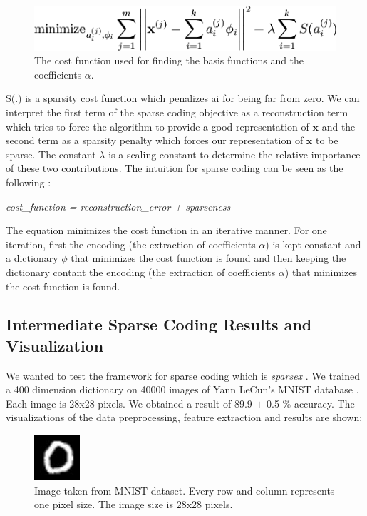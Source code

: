 \documentclass[	DIV=calc,%
				paper=a4,%
				fontsize=11pt,%
				twocolumn]{scrartcl}	 %
\begin{document}
\begin{figure}[H]
    \centering
    \includegraphics[width=0.8\linewidth]{data/sc_data/sc_equation.png}
    \caption{The cost function used for finding the basis functions and the coefficients $\alpha$.}
    \label{cnn_results_4.png}
\end{figure}

S(.) is a sparsity cost function which penalizes ai for being far from zero. We can interpret the first term of the sparse coding objective as a reconstruction term which tries to force the algorithm to provide a good representation of $\mathbf{x}$ and the second term as a sparsity penalty which forces our representation of $\mathbf{x}$ to be sparse. The constant $\lambda$ is a scaling constant to determine the relative importance of these two contributions. The intuition for sparse coding can be seen as the following \cite{olshausen_1997} :

\textit{cost\_function = reconstruction\_error + sparseness} 

\noindent The equation minimizes the cost function in an iterative manner. For one iteration, first the encoding (the extraction of coefficients $\alpha$) is kept constant and a dictionary $\phi$ that minimizes the cost function is found and then keeping the dictionary contant the encoding (the extraction of coefficients $\alpha$) that minimizes the cost function is found.


\subsection*{Intermediate Sparse Coding Results and Visualization}
We wanted to test the framework for sparse coding which is \textit{sparsex} \cite{sparsex}. We trained a 400 dimension dictionary on 40000 images of Yann LeCun's MNIST database \cite{mnist}. Each image is 28x28 pixels. We obtained a result of 89.9  $\pm$ 0.5 \% accuracy. The visualizations of the data preprocessing, feature extraction and results are shown:

\begin{figure}[H]
    \centering
    \includegraphics[width=0.3\linewidth]{data/sc_data/sc_mnist_image.jpg}
    \caption{Image taken from MNIST dataset. Every row and column represents one pixel size. The image size is 28x28 pixels.}
    \label{sc_mnist_image}
\end{figure}
\end{document}
